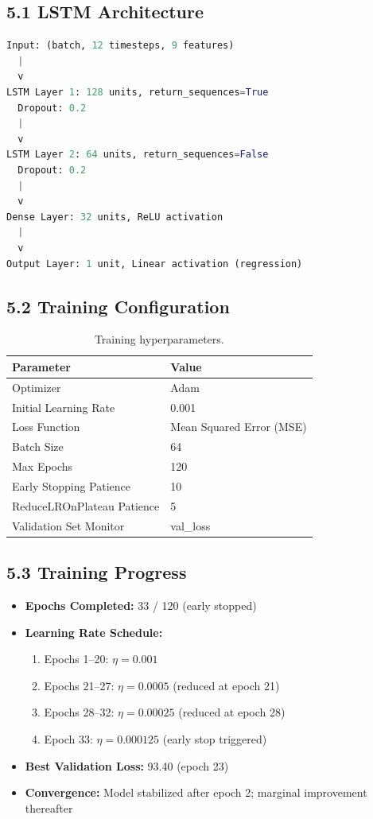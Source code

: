 \documentclass[11pt,a4paper]{article}
\begin{document}
\subsection{5.1 LSTM Architecture}

\begin{lstlisting}[language=Python, basicstyle=\ttfamily\small]
Input: (batch, 12 timesteps, 9 features)
  |
  v
LSTM Layer 1: 128 units, return_sequences=True
  Dropout: 0.2
  |
  v
LSTM Layer 2: 64 units, return_sequences=False
  Dropout: 0.2
  |
  v
Dense Layer: 32 units, ReLU activation
  |
  v
Output Layer: 1 unit, Linear activation (regression)
\end{lstlisting}

\subsection{5.2 Training Configuration}

\begin{table}[h]
\centering
\begin{tabular}{ll}
\toprule
\textbf{Parameter} & \textbf{Value} \\
\midrule
Optimizer & Adam \\
Initial Learning Rate & 0.001 \\
Loss Function & Mean Squared Error (MSE) \\
Batch Size & 64 \\
Max Epochs & 120 \\
Early Stopping Patience & 10 \\
ReduceLROnPlateau Patience & 5 \\
Validation Set Monitor & val\_loss \\
\bottomrule
\end{tabular}
\caption{Training hyperparameters.}
\end{table}

\subsection{5.3 Training Progress}

\begin{itemize}
    \item \textbf{Epochs Completed:} 33 / 120 (early stopped)
    \item \textbf{Learning Rate Schedule:}
    \begin{enumerate}
        \item Epochs 1--20: $\eta = 0.001$
        \item Epochs 21--27: $\eta = 0.0005$ (reduced at epoch 21)
        \item Epochs 28--32: $\eta = 0.00025$ (reduced at epoch 28)
        \item Epoch 33: $\eta = 0.000125$ (early stop triggered)
    \end{enumerate}
    \item \textbf{Best Validation Loss:} 93.40 (epoch 23)
    \item \textbf{Convergence:} Model stabilized after epoch 2; marginal improvement thereafter
\end{itemize}
\end{document}

